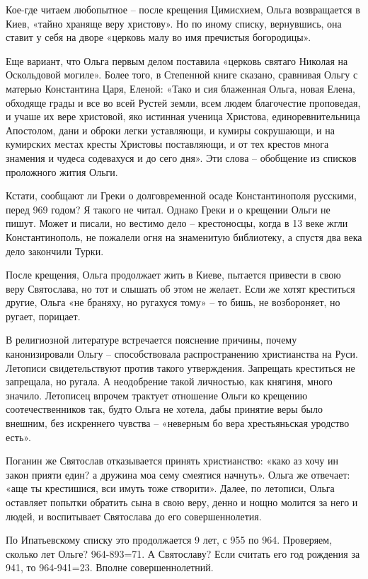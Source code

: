 Кое-где читаем любопытное – после крещения Цимисхием, Ольга возвращается в Киев, «тайно храняще веру христову». Но по иному списку, вернувшись, она ставит у себя на дворе «церковь малу во имя пречистыя богородицы». 

Еще вариант, что Ольга первым делом поставила «церковь святаго Николая на Оскольдовой могиле». Более того, в Степенной книге сказано, сравнивая Ольгу с матерью Константина Царя, Еленой: «Тако и сия блаженная Ольга, новая Елена, обходяще грады и все во всей Рустей земли, всем людем благочестие проповедая, и учаше их вере христовой, яко истинная ученица Христова, единоревнительница Апостолом, дани и оброки легки уставляющи, и кумиры сокрушающи, и на кумирских местах кресты Христовы поставляющи, и от тех крестов многа знамения и чудеса содевахуся и до сего дня». Эти слова – обобщение из списков проложного жития Ольги.

Кстати, сообщают ли Греки о долговременной осаде Константинополя русскими, перед 969 годом? Я такого не читал. Однако Греки и о крещении Ольги не пишут. Может и писали, но вестимо дело – крестоносцы, когда в 13 веке жгли Константинополь, не пожалели огня на знаменитую библиотеку, а спустя два века дело закончили Турки.

После крещения, Ольга продолжает жить в Киеве, пытается привести в свою веру Святослава, но тот и слышать об этом не желает. Если же хотят креститься другие, Ольга «не браняху, но ругахуся тому» – то бишь, не возбороняет, но ругает, порицает.

В религиозной литературе встречается пояснение причины, почему канонизировали Ольгу – способствовала распространению христианства на Руси. Летописи свидетельствуют против такого утверждения. Запрещать креститься не запрещала, но ругала. А неодобрение такой личностью, как княгиня, много значило. Летописец впрочем трактует отношение Ольги ко крещению соотечественников так, будто Ольга не хотела, дабы принятие веры было внешним, без искреннего чувства – «неверным бо вера хрестьяньская уродство есть».

Поганин же Святослав отказывается принять христианство: «како аз хочу ин закон прияти един? а дружина моа сему смеятися начнуть». Ольга же отвечает: «аще ты крестишися, вси имуть тоже створити». Далее, по летописи, Ольга оставляет попытки обратить сына в свою веру, денно и нощно молится за него и людей, и воспитывает Святослава до его совершеннолетия. 

По Ипатьевскому списку это продолжается 9 лет, с 955 по 964. Проверяем, сколько лет Ольге? 964-893=71. А Святославу? Если считать его год рождения за 941, то 964-941=23. Вполне совершеннолетний. 

